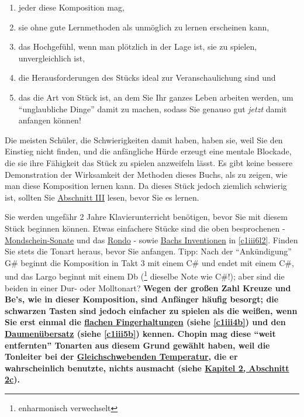 \begin{enumerate}[label={\arabic*.}] 
 \item jeder diese Komposition mag,
 \item sie ohne gute Lernmethoden als unmöglich zu lernen erscheinen kann,
 \item das Hochgefühl, wenn man plötzlich in der Lage ist, sie zu spielen, unvergleichlich ist,
 \item die Herausforderungen des Stücks ideal zur Veranschaulichung sind und
 \item das die Art von Stück ist, an dem Sie Ihr ganzes Leben arbeiten werden, um \enquote{unglaubliche Dinge} damit zu machen, sodass Sie genauso gut \textit{jetzt} damit anfangen können!
 \end{enumerate}
Die meisten Schüler, die Schwierigkeiten damit haben, haben sie, weil Sie den Einstieg nicht finden, und die anfängliche Hürde erzeugt eine mentale Blockade, die sie ihre Fähigkeit das Stück zu spielen anzweifeln lässt.
Es gibt keine bessere Demonstration der Wirksamkeit der Methoden dieses Buchs, als zu zeigen, wie man diese Komposition lernen kann.
Da dieses Stück jedoch ziemlich schwierig ist, sollten Sie \hyperref[c1iii1]{Abschnitt III} lesen, bevor Sie es lernen.

Sie werden ungefähr 2 Jahre Klavierunterricht benötigen, bevor Sie mit diesem Stück beginnen können.
Etwas einfachere Stücke sind die oben besprochenen - \hyperref[c1ii25b]{Mondschein-Sonate} und das \hyperref[c1ii25c]{Rondo} - sowie \hyperref[c1iii6l2]{Bachs Inventionen} in \ref*{c1iii6l2}.
Finden Sie stets die Tonart heraus, bevor Sie anfangen.
Tipp: Nach der \enquote{Ankündigung} G\# beginnt die Komposition in Takt 3 mit einem C\# und endet mit einem C\#, und das Largo beginnt mit einem Db (\footnote{enharmonisch verwechselt} dieselbe Note wie C\#!); aber sind die beiden in einer Dur- oder Molltonart?
\textbf{Wegen der großen Zahl Kreuze und Be's, wie in dieser Komposition, sind Anfänger häufig besorgt;
die schwarzen Tasten sind jedoch einfacher zu spielen als die weißen, wenn Sie erst einmal die \hyperref[c1iii4b]{flachen Fingerhaltungen} (siehe \ref*{c1iii4b}) und den \hyperref[c1iii5b]{Daumenübersatz} (siehe \ref*{c1iii5b}) kennen.
Chopin mag diese \enquote{weit entfernten} Tonarten aus diesem Grund gewählt haben, weil die Tonleiter bei der \hyperref[et1]{Gleichschwebenden Temperatur}, die er wahrscheinlich benutzte, nichts ausmacht (siehe \hyperref[c2_2c]{Kapitel 2, Abschnitt 2c}).}

